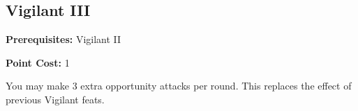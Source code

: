 \subsection{Vigilant III}\label{feat:vigilant3}

\noindent
\textbf{Prerequisites:} Vigilant II

\noindent
\textbf{Point Cost:} 1

You may make 3 extra opportunity attacks per round. This replaces the effect
of previous Vigilant feats.
